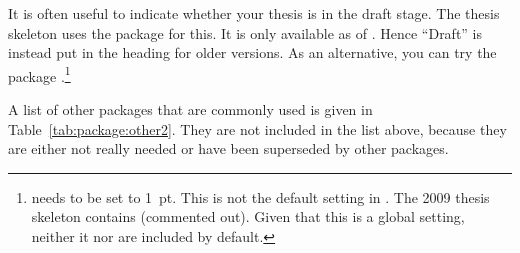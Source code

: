 It is often useful to indicate whether your thesis is in the draft stage.
The thesis skeleton uses the package  for this.
It is only available as of .
Hence \enquote{Draft} is instead put in the heading for older versions.
As an alternative, you can try the package .\footnote{%
 needs  to be set to \SI{1}{pt}.
This is not the default setting in .
The 2009 thesis skeleton contains  (commented out).
Given that this is a global setting, neither it nor  are included by default.}

A list of other packages that are commonly used is given in
Table~\ref{tab:package:other2}. They are not
included in the list above, because they are either not really needed
or have been superseded by other packages.


